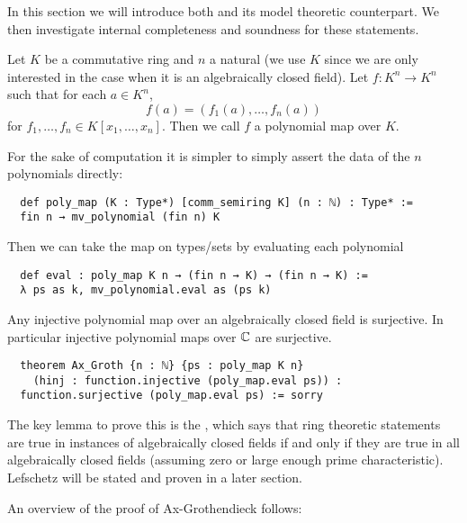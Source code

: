In this section we will introduce both  and
its model theoretic counterpart.
We then investigate internal completeness and soundness for these statements.

\begin{dfn}
  Let $K$ be a commutative ring and $n$ a natural
  (we use $K$ since we are only interested in the case
  when it is an algebraically closed field).
  Let $f : K^n \to K^n$ such that for each $a \in K^n$,
  \[f(a) = (f_1(a), \dots, f_n(a))\] for
  $f_1, \dots, f_n \in K[x_1, \dots, x_n]$.
  Then we call $f$ a polynomial map over $K$.

  For the sake of computation it is simpler to simply assert
  the data of the $n$ polynomials directly:

  \begin{lstlisting}
  def poly_map (K : Type*) [comm_semiring K] (n : ℕ) : Type* :=
  fin n → mv_polynomial (fin n) K \end{lstlisting}

  Then we can take the map on types/sets by evaluating each polynomial
  \begin{lstlisting}
  def eval : poly_map K n → (fin n → K) → (fin n → K) :=
  λ ps as k, mv_polynomial.eval as (ps k) \end{lstlisting}
\end{dfn}

\begin{prop}[Ax-Grothendieck]
    Any injective polynomial map over an algebraically closed field is surjective.
    In particular injective polynomial maps over $\mathbb{C}$ are surjective.

\begin{lstlisting}
  theorem Ax_Groth {n : ℕ} {ps : poly_map K n}
    (hinj : function.injective (poly_map.eval ps)) :
  function.surjective (poly_map.eval ps) := sorry \end{lstlisting}
\end{prop}

The key lemma to prove this is the ,
which says that ring theoretic statements are true in instances of algebraically closed fields
if and only if they are true in all algebraically closed fields
(assuming zero or large enough prime characteristic).
Lefschetz will be stated and proven in a later section.

An overview of the proof of Ax-Grothendieck follows:

